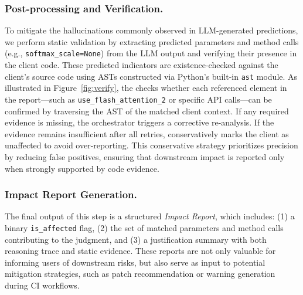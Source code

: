 \subsubsection{Post-processing and Verification.}
To mitigate the hallucinations commonly observed in LLM-generated predictions, we perform static validation by extracting predicted parameters and method calls (e.g., \texttt{softmax\_scale=None}) from the LLM output and verifying their presence in the client code. 
These predicted indicators are existence-checked against the client's source code using ASTs constructed via Python’s built-in \texttt{ast} module.
As illustrated in Figure~\ref{fig:verify}, the \appname checks whether each referenced element in the report—such as \texttt{use\_flash\_attention\_2} or specific API calls—can be confirmed by traversing the AST of the matched client context.
If any required evidence is missing, the orchestrator triggers a corrective re-analysis.
If the evidence remains insufficient after all retries, \appname conservatively marks the client as unaffected to avoid over-reporting.
This conservative strategy prioritizes precision by reducing false positives, ensuring that downstream impact is reported only when strongly supported by code evidence.

\subsubsection{Impact Report Generation.}
The final output of this step is a structured \textit{Impact Report}, which includes: (1) a binary \texttt{is\_affected} flag, (2) the set of matched parameters and method calls contributing to the judgment, and (3) a justification summary with both reasoning trace and static evidence. 
These reports are not only valuable for informing users of downstream risks, but also serve as input to potential mitigation strategies, such as patch recommendation or warning generation during CI workflows.
